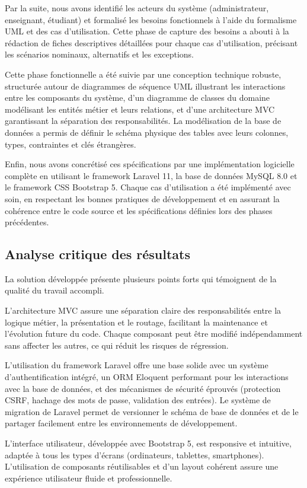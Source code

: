 \documentclass[12pt,a4paper]{report}
\begin{document}
Par la suite, nous avons identifié les acteurs du système (administrateur, enseignant, étudiant) et formalisé les besoins fonctionnels à l'aide du formalisme UML et des cas d'utilisation. Cette phase de capture des besoins a abouti à la rédaction de fiches descriptives détaillées pour chaque cas d'utilisation, précisant les scénarios nominaux, alternatifs et les exceptions.

Cette phase fonctionnelle a été suivie par une conception technique robuste, structurée autour de diagrammes de séquence UML illustrant les interactions entre les composants du système, d'un diagramme de classes du domaine modélisant les entités métier et leurs relations, et d'une architecture MVC garantissant la séparation des responsabilités. La modélisation de la base de données a permis de définir le schéma physique des tables avec leurs colonnes, types, contraintes et clés étrangères.

Enfin, nous avons concrétisé ces spécifications par une implémentation logicielle complète en utilisant le framework Laravel 11, la base de données MySQL 8.0 et le framework CSS Bootstrap 5. Chaque cas d'utilisation a été implémenté avec soin, en respectant les bonnes pratiques de développement et en assurant la cohérence entre le code source et les spécifications définies lors des phases précédentes.

\subsection*{Analyse critique des résultats}
La solution développée présente plusieurs points forts qui témoignent de la qualité du travail accompli.

L'architecture MVC assure une séparation claire des responsabilités entre la logique métier, la présentation et le routage, facilitant la maintenance et l'évolution future du code. Chaque composant peut être modifié indépendamment sans affecter les autres, ce qui réduit les risques de régression.

L'utilisation du framework Laravel offre une base solide avec un système d'authentification intégré, un ORM Eloquent performant pour les interactions avec la base de données, et des mécanismes de sécurité éprouvés (protection CSRF, hachage des mots de passe, validation des entrées). Le système de migration de Laravel permet de versionner le schéma de base de données et de le partager facilement entre les environnements de développement.

L'interface utilisateur, développée avec Bootstrap 5, est responsive et intuitive, adaptée à tous les types d'écrans (ordinateurs, tablettes, smartphones). L'utilisation de composants réutilisables et d'un layout cohérent assure une expérience utilisateur fluide et professionnelle.
\end{document}

